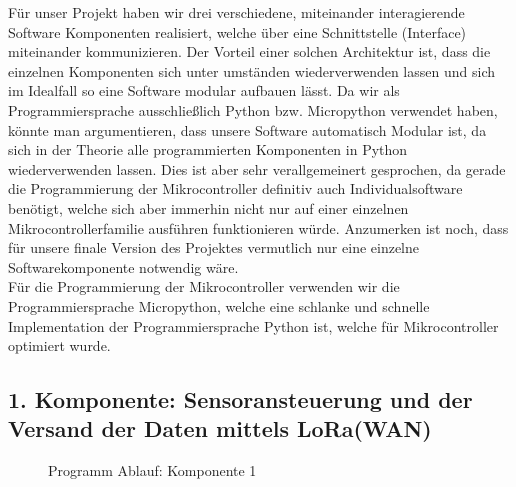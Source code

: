 Für unser Projekt haben wir drei verschiedene, miteinander interagierende Software Komponenten realisiert, welche über eine Schnittstelle (Interface) miteinander kommunizieren. 
Der Vorteil einer solchen Architektur ist, dass die einzelnen Komponenten sich unter umständen wiederverwenden lassen und sich im Idealfall so eine Software modular aufbauen lässt.
Da wir als Programmiersprache ausschließlich Python bzw. Micropython verwendet haben, könnte man argumentieren, dass unsere Software automatisch Modular ist, da sich in der Theorie alle programmierten Komponenten in Python wiederverwenden lassen.
Dies ist aber sehr verallgemeinert gesprochen, da gerade die Programmierung der Mikrocontroller definitiv auch Individualsoftware benötigt, welche sich aber immerhin nicht nur auf einer einzelnen Mikrocontrollerfamilie ausführen funktionieren würde.
Anzumerken ist noch, dass für unsere finale Version des Projektes vermutlich nur eine einzelne Softwarekomponente notwendig wäre.\\
Für die Programmierung der Mikrocontroller verwenden wir die Programmiersprache Micropython, welche eine schlanke und schnelle Implementation der Programmiersprache Python ist, welche für Mikrocontroller optimiert wurde.

\newpage


\subsection{1. Komponente: Sensoransteuerung und der Versand der Daten mittels LoRa(WAN)} \label{Sender}


\begin{center}
	\begin{figure}[h]
	 
	 \noindent{}
	 \caption[PAP komponente 1]{Programm Ablauf: Komponente 1}
	 \label{fig:lorasendsensorread}
	\end{figure}
\end{center}

